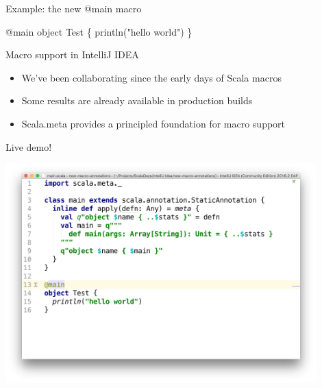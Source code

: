 \documentclass[svgnames,dvipsnames,hyperref={bookmarks=false},usepdftitle=false]{beamer}
\begin{document}
\begin{frame}[fragile]{Example: the new @main macro}
\small{
\begin{semiverbatim}
@main object Test \{
  println("hello world")
\}


\end{semiverbatim}}
\end{frame}

\begin{frame}{Macro support in IntelliJ IDEA}
\begin{itemize}
\item We've been collaborating since the early days of Scala macros
\item Some results are already available in production builds
\item Scala.meta provides a principled foundation for macro support
\end{itemize}
\end{frame}

\begin{frame}[c, fragile]{Live demo!}
\vskip20pt
\begin{center}
\includegraphics[width=12cm]{intellij.png}
\end{center}
\end{frame}
\end{document}
